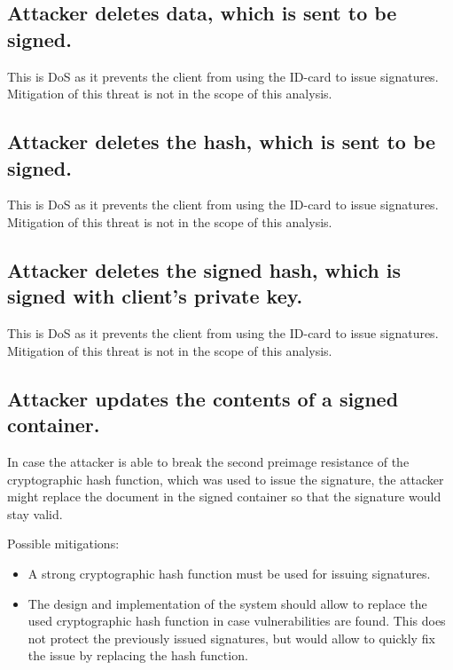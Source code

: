\subsection{Attacker deletes data, which is sent to be signed.}
\label{threat:delete-data-for-signing}
This is DoS as it prevents the client from using the ID-card to issue signatures. Mitigation of this threat is not in the scope of this analysis.

\subsection{Attacker deletes the hash, which is sent to be signed.}
\label{threat:delete-hash-for-signing}
This is DoS as it prevents the client from using the ID-card to issue signatures. Mitigation of this threat is not in the scope of this analysis.

\subsection{Attacker deletes the signed hash, which is signed with client's private key.}
\label{threat:delete-signed-hash}
This is DoS as it prevents the client from using the ID-card to issue signatures. Mitigation of this threat is not in the scope of this analysis.


\subsection{Attacker updates the contents of a signed container.}
\label{threat:update-signed-container}
In case the attacker is able to break the second preimage resistance of the cryptographic hash function, which was used to issue the signature, the attacker might replace the document in the signed container so that the signature would stay valid.

Possible mitigations:
\begin{itemize}
\item A strong cryptographic hash function must be used for issuing signatures.

\item The design and implementation of the system should allow to replace the used cryptographic hash function in case vulnerabilities are found. This does not protect the previously issued signatures, but would allow to quickly fix the issue by replacing the hash function.
\end{itemize}

